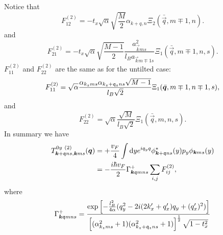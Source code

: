 Notice that
%
\begin{equation}
  F^{(2)}_{12}
  = -t_x \sqrt{\alpha}  \sqrt{\frac{M}{2}} \alpha_{k+q, n} \Xi_2(\bar{\vec{q}}, m\mp 1, n).
\end{equation}
and
\begin{equation}
  \label{eq:148}
  F^{(2)}_{21}
  =
  -t_{x} \sqrt{\alpha} \sqrt{\frac{M-1}{2}} \frac{a_{\vec{k} m s}^2}{l_B a_{\vec{k} m \mp 1 s}}
  \Xi_{1} (\bar{\vec{q}}, m \mp 1, n, s).
\end{equation}
\( F^{(2)}_{11} \) and \( F^{(2)}_{22} \) are the same as for the untilted case:
\begin{equation}
  \label{eq:149}
  F^{(2)}_{11} = \sqrt{\alpha}  \frac{\alpha_{k_z m s} \alpha_{k_z + \mathfrak{q}_z ns} \sqrt{M-1} }{ l_B \sqrt{2} }
  \Xi_{1} (\bar{\bm{q}}, m\mp 1, n\mp 1, s),
\end{equation}
and
\begin{equation}
  \label{eq:150}
  F^{(2)}_{22} =
  \sqrt{\alpha }
  \frac{\sqrt{M} }{l_B \sqrt{2} }
  \Xi_{1} ( \bar{\vec{q}}, m, n, s ).
\end{equation}
In summary we have
\begin{align}
  \label{eq:151}
  T^{0y~(2)}_{\bm{k} + \mathfrak{q} ns, \bm{k} ms} (\bm{q}) &= + \frac{v_F}{4} \int \mathrm{d} y
  e^{i q_y q} \phi _{\bm{k} + \mathfrak{q} ns}^{*} (y) p_{y} \phi _{\bm{k} ms} (y)\\
&= -\frac{ i \hbar v_{F} }{2}
                                                                                     \Gamma _{\bm{k} \mathfrak{q} m n s}^+
\sum\limits_{i,j}^{} F^{(2)}_{ij},
\end{align}
where
\[
  \Gamma _{\bm{k} \mathfrak{q} m n s}^+ =
  \frac{
  \exp
  \left[
    - \frac{l_{B}^2}{4 \alpha } (q_{y}^2 - 2 i (2k' _x + q' _x) q_{y} + (q' _x)^2 )
  \right  ]
}{
  \left[(\alpha_{k_z m s}^2 +1) (\alpha_{k_z + \mathfrak{q}_z ns} ^2 + 1)\right]^{\frac{1}{2}}
  \sqrt{1 - t_x^2 }}
\]

